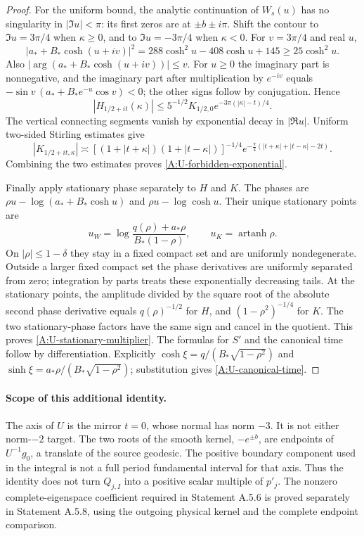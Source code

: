 \begin{proof}
For the uniform bound, the analytic continuation of $W_s(u)$
has no singularity in $|\Im u|<\pi$: its first zeros are
at $\pm b\pm i\pi$.
Shift the contour to $\Im u=3\pi/4$ when $\kappa\geq0$,
and to $\Im u=-3\pi/4$ when $\kappa<0$.
For $v=3\pi/4$ and real $u$,
\[
 |a_*+B_*\cosh(u+iv)|^2
   =288\cosh^2u-408\cosh u+145
   \geq25\cosh^2u.
\]
Also $|\arg(a_*+B_*\cosh(u+iv))|\leq v$.
For $u\geq0$ the imaginary part is nonnegative, and
the imaginary part after multiplication by $e^{-iv}$ equals
$-\sin v\,(a_*+B_*e^{-u}\cos v)<0$;
the other signs follow by conjugation. Hence
\[
 |H_{1/2+it}(\kappa)|
 \leq 5^{-1/2}K_{1/2,0}
       e^{-3\pi(|\kappa|-t)/4}.
\]
The vertical connecting segments vanish by exponential decay in
$|\Re u|$. Uniform two-sided Stirling estimates give
\[
 |K_{1/2+it,\kappa}|
 \asymp
 [(1+|t+\kappa|)(1+|t-\kappa|)]^{-1/4}
 e^{-\frac\pi4(|t+\kappa|+|t-\kappa|-2t)}.
\]
Combining the two estimates proves
\eqref{A:U-forbidden-exponential}.

Finally apply stationary phase separately to $H$ and $K$.
The phases are $\rho u-\log(a_*+B_*\cosh u)$ and
$\rho u-\log\cosh u$.
Their unique stationary points are
\[
 u_W=\log\frac{q(\rho)+a_*\rho}{B_*(1-\rho)},
 \qquad u_K=\operatorname{artanh}\rho .
\]
On $|\rho|\leq1-\delta$ they stay in a fixed compact set and
are uniformly nondegenerate. Outside a larger fixed compact set
the phase derivatives are uniformly separated from zero;
integration by parts treats these exponentially decreasing tails.
At the stationary points, the amplitude divided by the square root
of the absolute second phase derivative equals $q(\rho)^{-1/2}$
for $H$, and $(1-\rho^2)^{-1/4}$ for $K$.
The two stationary-phase factors have the same sign and cancel
in the quotient. This proves \eqref{A:U-stationary-multiplier}.
The formulas for $S'$ and the canonical time follow by differentiation.
Explicitly
$\cosh\xi=q/(B_*\sqrt{1-\rho^2})$ and
$\sinh\xi=a_*\rho/(B_*\sqrt{1-\rho^2})$; substitution gives
\eqref{A:U-canonical-time}.
\end{proof}

\paragraph{Scope of this additional identity.}
The axis of $U$ is the mirror $t=0$, whose normal has norm $-3$.
It is not either norm-$-2$ target.
The two roots of the smooth kernel, $-e^{\pm b}$, are endpoints
of $U^{-1}g_0$, a translate of the source geodesic.
The positive boundary component used in the integral is not a
full period fundamental interval for that axis. Thus the identity
does not turn $Q_{j,I}$ into a positive scalar multiple of $p'_j$.
The nonzero complete-eigenspace coefficient required in
Statement A.5.6 is proved separately in Statement A.5.8, using
the outgoing physical kernel and the complete endpoint comparison.


